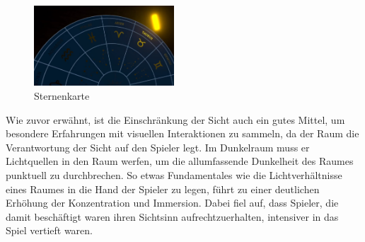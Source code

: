 \begin{figure}[h]
	\centering
	\includegraphics[width=\textwidth/3, height=3cm]{Pictures/Dunkelraum_Sternenkarte}
	\caption{Sternenkarte}
	\label{fig:dunkelraum_sternenkarte}
\end{figure}\newpage \noindent
Wie zuvor erwähnt, ist die Einschränkung der Sicht auch ein gutes Mittel, um besondere Erfahrungen mit visuellen Interaktionen zu sammeln, da der Raum die Verantwortung der Sicht auf den Spieler legt. Im Dunkelraum muss er Lichtquellen in den Raum werfen, um die allumfassende Dunkelheit des Raumes punktuell zu durchbrechen. So etwas Fundamentales wie die Lichtverhältnisse eines Raumes in die Hand der Spieler zu legen, führt zu einer deutlichen Erhöhung der Konzentration und Immersion. Dabei fiel auf, dass Spieler, die damit beschäftigt waren ihren Sichtsinn aufrechtzuerhalten, intensiver in das Spiel vertieft waren.
